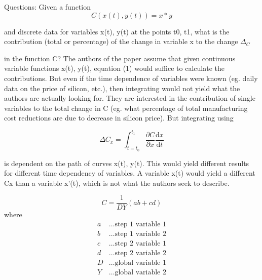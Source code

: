 \documentclass{article}
\begin{document}
Questions:
Given a function
\begin{equation}
    C(x(t), y(t)) = x * y
\end{equation}

and discrete data for variables x(t), y(t) at the points t0, t1, what is the contribution
(total or percentage) of the change in variable x to the change $\Delta_C$

in the function C?
The authors of the paper assume that given continuous variable functions x(t), y(t), equation
(1) would suffice to calculate the contributions. But even if the time dependence
of variables were known (eg. daily data on the price of silicon, etc.), then integrating
would not yield what the authors are actually looking for.
They are interested in the contribution of single variables to the total change in C (eg.
what percentage of total manufacturing cost reductions are due to decrease in silicon
price). But integrating using

\begin{equation}
    \Delta C_x = \int_{t=t_0}^{t_1} \frac{\partial C}{\partial x} \frac{\text{d}x}{\text{d}t}
\end{equation}

is dependent on the path of curves x(t), y(t). This would yield different results for different
time dependency of variables. A variable x(t) would yield a different Cx than a
variable x'(t), which is not what the authors seek to describe.

%
\begin{equation}
    C = \frac{1}{DY}(ab+cd)
\end{equation}
%
where
%
\begin{align*}
    a &\dots \text{step 1 variable 1} \\
    b &\dots \text{step 1 variable 2} \\
    c &\dots \text{step 2 variable 1} \\
    d &\dots \text{step 2 variable 2} \\
    D &\dots \text{global variable 1} \\
    Y &\dots \text{global variable 2}
\end{align*}
%
\end{document}
